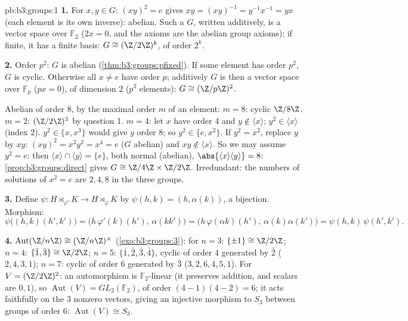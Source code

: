 \begin{solution}{pb:b3:groups:1}
\textbf{1.} For $x, y \in G$: $(xy)^2 = e$ gives $xy = (xy)^{-1} =
y^{-1}x^{-1} = yx$ (each element is its own inverse): abelian.
Such a $G$, written additively, is a vector space over $\mathbb
F_2$ ($2x = 0$, and the axioms are the abelian group axioms); if
finite, it has a finite basis: $G \cong (\Z/2\Z)^k$, of order
$2^k$.

\textbf{2.} Order $p^2$: $G$ is abelian
(\cref{thm:b3:groups:pfixed}). If some element has order $p^2$,
$G$ is cyclic. Otherwise all $x \neq e$ have order $p$; additively
$G$ is then a vector space over $\mathbb F_p$ ($px = 0$), of
dimension $2$ ($p^2$ elements): $G \cong (\Z/p\Z)^2$.

Abelian of order $8$, by the maximal order $m$ of an element: $m =
8$: cyclic $\Z/8\Z$. $m = 2$: $(\Z/2\Z)^3$ by question 1. $m = 4$:
let $x$ have order $4$ and $y \notin \langle x \rangle$; $y^2 \in
\langle x\rangle$ (index $2$). $y^2 \in \{x, x^3\}$ would give $y$
order $8$; so $y^2 \in \{e, x^2\}$. If $y^2 = x^2$, replace $y$ by
$xy$: $(xy)^2 = x^2y^2 = x^4 = e$ ($G$ abelian) and $xy \notin
\langle x\rangle$. So we may assume $y^2 = e$: then $\langle x
\rangle \cap \langle y \rangle = \{e\}$, both normal (abelian),
$\abs{\langle x\rangle \langle y\rangle} = 8$:
\cref{prop:b3:groups:direct} gives $G \cong \Z/4\Z \times \Z/2\Z$.
Irredundant: the numbers of solutions of $x^2 = e$ are $2, 4, 8$
in the three groups.

\textbf{3.} Define $\psi \colon H \rtimes_{\varphi'} K \to H
\rtimes_{\varphi} K$ by $\psi(h, k) = (h, \alpha(k))$, a bijection.
Morphism:
\[
\psi\bigl((h,k)(h',k')\bigr)
= \bigl(h\,\varphi'(k)(h'),\, \alpha(kk')\bigr)
= \bigl(h\,\varphi(\alpha k)(h'),\, \alpha(k)\alpha(k')\bigr)
= \psi(h,k)\,\psi(h',k').
\]

\textbf{4.} $\operatorname{Aut}(\Z/n\Z) \cong (\Z/n\Z)^\times$
(\cref{exo:b3:groups:3}): for $n = 3$: $\{\pm 1\} \cong \Z/2\Z$;
$n = 4$: $\{\bar 1, \bar 3\} \cong \Z/2\Z$; $n = 5$: $\{\bar 1,
\bar 2, \bar 3, \bar 4\}$, cyclic of order $4$ generated by $\bar
2$ ($2, 4, 3, 1$); $n = 7$: cyclic of order $6$ generated by $\bar
3$ ($3, 2, 6, 4, 5, 1$). For $V = (\Z/2\Z)^2$: an automorphism is
$\mathbb F_2$-linear (it preserves addition, and scalars are $0,
1$), so $\operatorname{Aut}(V) = GL_2(\mathbb F_2)$, of order
$(4-1)(4-2) = 6$; it acts faithfully on the $3$ nonzero vectors,
giving an injective morphism to $S_3$ between groups of order
$6$: $\operatorname{Aut}(V) \cong S_3$.


\end{solution}
